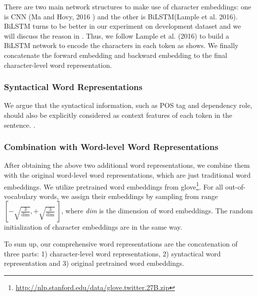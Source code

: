 There are two main network structures to make use of character embeddings: 
one is CNN (Ma and Hovy, 2016 \cite{} ) and the other is BiLSTM(Lample et al. 2016).
BiLSTM turns to be better in our experiment on development dataset and we will discuss the reason in .
Thus, we follow Lample et al. (2016) to build a BiLSTM network to encode the characters in each token as  shows. 
We finally concatenate the forward embedding and backward embedding to the final character-level word representation.



\subsubsection{Syntactical Word Representations}
We argue that the syntactical information, such as POS tag and dependency role, should also be explicitly considered as context features of each token in the sentence. 
.
 
\subsubsection{Combination with Word-level Word Representations}
After obtaining the above two additional word representations, we combine them with the original word-level word representations, which are just traditional word embeddings. 
We utilize pretrained word embeddings from glove\footnote{\url{http://nlp.stanford.edu/data/glove.twitter.27B.zip}}.
For all out-of-vocabulary words, we assign their embeddings by sampling from range $\left[-\sqrt{\frac{3}{\text{dim}}}, +\sqrt{\frac{3}{\text{dim}}}~\right]$, where \textit{dim} is the dimension of word embeddings. The random initialization of character embeddings are in the same way.

To sum up, our comprehensive word representations are the concatenation of three parts: 1) character-level word representations, 2) syntactical word representation and 3)  original pretrained word embeddings.

